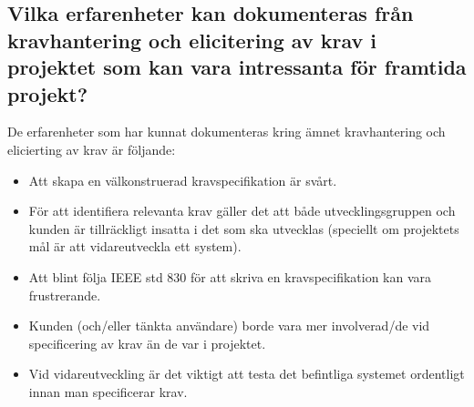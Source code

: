 \subsection{Vilka erfarenheter kan dokumenteras från kravhantering och elicitering av krav i projektet som kan vara intressanta för framtida projekt?}
De erfarenheter som har kunnat dokumenteras kring ämnet kravhantering och elicierting av krav är följande:
\begin{itemize}
	\item Att skapa en välkonstruerad kravspecifikation är svårt.
	\item För att identifiera relevanta krav gäller det att både utvecklingsgruppen och kunden är tillräckligt insatta i det som ska utvecklas (speciellt om projektets mål är att vidareutveckla ett system).
	\item Att blint följa IEEE std 830 för att skriva en kravspecifikation kan vara frustrerande.
	\item Kunden (och/eller tänkta användare) borde vara mer involverad/de vid specificering av krav än de var i projektet.
	\item Vid vidareutveckling är det viktigt att testa det befintliga systemet ordentligt innan man specificerar krav.
\end{itemize}


